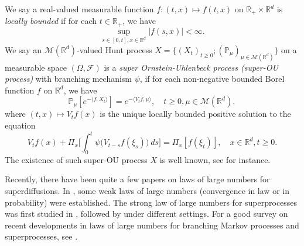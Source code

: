 \documentclass[12pt,a4paper]{amsart}
\theoremstyle{plain}
\theoremstyle{definition}
\numberwithin{equation}{section}
\begin{document}
    We say a real-valued measurable function $f:(t,x)\mapsto f(t,x)$ on $\mathbb R_+\times \mathbb R^d$ is \emph{locally bounded} if for each $t\in \mathbb R_+$, we have
\[
    \sup_{s\in [0,t],x\in \mathbb R^d} |f(s,x)|<\infty.
\]
       We say an $\mathcal M(\mathbb R^d)$-valued Hunt process $X = \{(X_t)_{t\geq 0}; (\mathbb{P}_{\mu})_{\mu \in \mathcal M(\mathbb R^d)}\}$ 
on a measurable space $(\Omega, \mathcal{F})$       
       is a \emph{super Ornstein-Uhlenbeck process (super-OU process)} with branching mechanism $\psi$, if for each non-negative bounded Borel function $f$ on $\mathbb R^d$, we have
\begin{equation}
\label{eq: def of V_t}
    \mathbb{P}_{\mu}[e^{-\langle f,X_t \rangle}]
    = e^{-\langle V_tf, \mu \rangle},
    \quad t\geq 0, \mu \in \mathcal M(\mathbb R^d),
\end{equation}
	where $(t,x) \mapsto V_tf(x)$ is the unique locally bounded positive solution to the equation
\begin{equation}
	    V_tf(x) + \Pi_x \Big[ \int_0^t\psi\big(V_{t-s}f(\xi_s)\big)~ds\Big]
	= \Pi_x [f(\xi_t)],
    \quad x\in \mathbb R^d, t\geq 0.
\end{equation}	
    The existence of such super-OU process $X$ is well known, see \cite{Dynkin1993Superprocesses} for instance.


    Recently, there have been quite a few papers on laws of large numbers for superdiffusions. In \cite{Englander2009Law, EnglanderWinter2006Law, EnglanderTuraev2002A-scaling}, some weak laws of large numbers (convergence in law or in probability) were established. The strong law of large numbers for superprocesses was first studied in \cite{ChenRenWang2008An-almost}, 
    followed by \cite{ChenRenSongZhang2015Strong-law, ChenRenYang2019Skeleton, EckhoffKyprianouWinkel2015Spines,KouritzinRen2014A-strong,LiuRenSong2013Strong, Wang2010An-almost} under different settings. 
    For a good survey on recent developments in laws of large numbers for branching Markov processes and superprocesses, see \cite{EckhoffKyprianouWinkel2015Spines}. 
\end{document}
